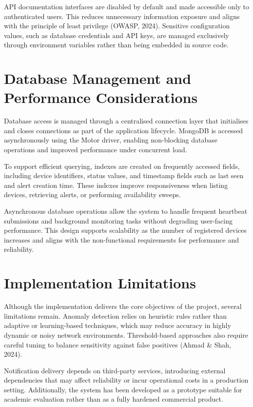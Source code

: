 API documentation interfaces are disabled by default and made accessible only to authenticated users. This reduces unnecessary information exposure and aligns with the principle of least privilege (OWASP, 2024). Sensitive configuration values, such as database credentials and API keys, are managed exclusively through environment variables rather than being embedded in source code.

\section{Database Management and Performance Considerations}

Database access is managed through a centralised connection layer that initialises and closes connections as part of the application lifecycle. MongoDB is accessed asynchronously using the Motor driver, enabling non-blocking database operations and improved performance under concurrent load.

To support efficient querying, indexes are created on frequently accessed fields, including device identifiers, status values, and timestamp fields such as last seen and alert creation time. These indexes improve responsiveness when listing devices, retrieving alerts, or performing availability sweeps.

Asynchronous database operations allow the system to handle frequent heartbeat submissions and background monitoring tasks without degrading user-facing performance. This design supports scalability as the number of registered devices increases and aligns with the non-functional requirements for performance and reliability.

\section{Implementation Limitations}

Although the implementation delivers the core objectives of the project, several limitations remain. Anomaly detection relies on heuristic rules rather than adaptive or learning-based techniques, which may reduce accuracy in highly dynamic or noisy network environments. Threshold-based approaches also require careful tuning to balance sensitivity against false positives (Ahmad \& Shah, 2024).

Notification delivery depends on third-party services, introducing external dependencies that may affect reliability or incur operational costs in a production setting. Additionally, the system has been developed as a prototype suitable for academic evaluation rather than as a fully hardened commercial product.

